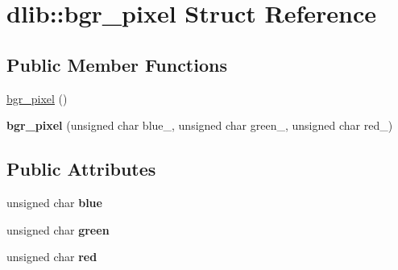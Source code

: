 \hypertarget{structdlib_1_1bgr__pixel}{
\section{dlib::bgr\_\-pixel Struct Reference}
\label{structdlib_1_1bgr__pixel}
}
\subsection*{Public Member Functions}
\begin{DoxyCompactItemize}
\item 
\hyperlink{structdlib_1_1bgr__pixel_a525b55be99d6be3a3a14d7b111f68708}{bgr\_\-pixel} ()
\item 
\hypertarget{structdlib_1_1bgr__pixel_a58a50096a7d29c76064b690f8709a621}{
{\bfseries bgr\_\-pixel} (unsigned char blue\_\-, unsigned char green\_\-, unsigned char red\_\-)}
\label{structdlib_1_1bgr__pixel_a58a50096a7d29c76064b690f8709a621}

\end{DoxyCompactItemize}
\subsection*{Public Attributes}
\begin{DoxyCompactItemize}
\item 
\hypertarget{structdlib_1_1bgr__pixel_ac6015d194beed3146cbc0db6fb50ea70}{
unsigned char {\bfseries blue}}
\label{structdlib_1_1bgr__pixel_ac6015d194beed3146cbc0db6fb50ea70}

\item 
\hypertarget{structdlib_1_1bgr__pixel_aa71b50bb0288cfcf07fc26c9d83c0efa}{
unsigned char {\bfseries green}}
\label{structdlib_1_1bgr__pixel_aa71b50bb0288cfcf07fc26c9d83c0efa}

\item 
\hypertarget{structdlib_1_1bgr__pixel_a3f7b74e4be61cbd0cf3b7d8809f4245a}{
unsigned char {\bfseries red}}
\label{structdlib_1_1bgr__pixel_a3f7b74e4be61cbd0cf3b7d8809f4245a}

\end{DoxyCompactItemize}


